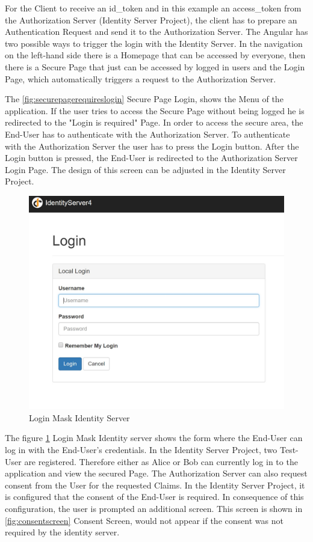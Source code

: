 For the Client to receive an id\_token and in this example an access\_token from the Authorization Server (Identity Server Project), the client has to prepare an Authentication Request and send it to the Authorization Server. The Angular has two possible ways to trigger the login with the Identity Server. In the navigation on the left-hand side there is a Homepage that can be accessed by everyone, then there is a Secure Page that just can be accessed by logged in users and the Login Page, which automatically triggers a request to the Authorization Server.



The \ref{fig:securepagerequireslogin} Secure Page Login, shows the Menu of the application. If the user tries to access the Secure Page without being logged he is redirected to the "Login is required" Page. In order to access the secure area, the End-User has to authenticate with the Authorization Server.
To authenticate with the Authorization Server the user has to press the Login button. After the Login button is pressed, the End-User is redirected to the Authorization Server Login Page. The design of this screen can be adjusted in the Identity Server Project. 

\begin{figure}[h]
	\centering
	\includegraphics[width=0.8\linewidth]{images/login_identity_server}
	\caption{Login Mask Identity Server}
	\label{fig:loginidentityserver}
\end{figure}


The figure \ref{fig:loginidentityserver} Login Mask Identity server shows the form where the End-User can log in with the End-User’s credentials. In the Identity Server Project, two Test-User are registered. Therefore either as Alice or Bob can currently log in to the application and view the secured Page. 
The Authorization Server can also request consent from the User for the requested Claims. In the Identity Server Project, it is configured that the consent of the End-User is required. In consequence of this configuration, the user is prompted an additional screen. This screen is shown in \ref{fig:consentscreen} Consent Screen, would not appear if the consent was not required by the identity server. 


